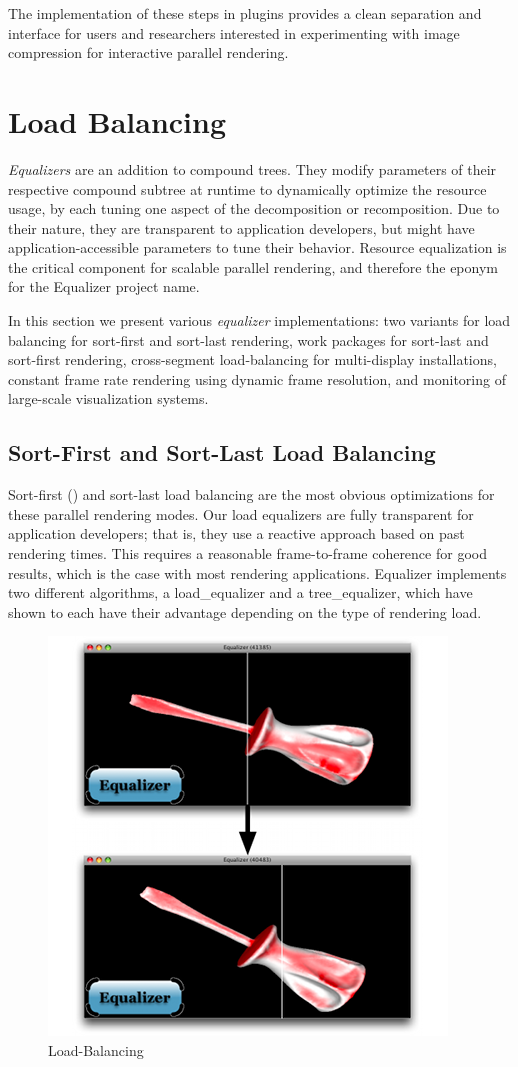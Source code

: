 The implementation of these steps in plugins provides a clean separation and
interface for users and researchers interested in experimenting with image
compression for interactive parallel rendering.


\chapter{Load Balancing}

{\em Equalizers} are an addition to compound trees. They modify parameters of
their respective compound subtree at runtime to dynamically optimize the
resource usage, by each tuning one aspect of the decomposition or recomposition.
Due to their nature, they are transparent to application developers, but might
have application-accessible parameters to tune their behavior. Resource
equalization is the critical component for scalable parallel rendering, and
therefore the eponym for the \textsf{Equalizer} project name.

In this section we present various {\em equalizer} implementations: two
variants for load balancing for sort-first and sort-last rendering, work
packages for sort-last and sort-first rendering, cross-segment load-balancing
for multi-display installations, constant frame rate rendering using dynamic
frame resolution, and monitoring of large-scale visualization systems.

\section{Sort-First and Sort-Last Load Balancing}

Sort-first () and sort-last load balancing are the most obvious
optimizations for these parallel rendering modes. Our load equalizers are fully
transparent for application developers; that is, they use a reactive approach
based on past rendering times. This requires a reasonable frame-to-frame
coherence for good results, which is the case with most rendering applications.
Equalizer implements two different algorithms, a \textsf{load\_equalizer} and a
\textsf{tree\_equalizer}, which have shown to each have their advantage
depending on the type of rendering load.

\begin{figure}
  \includegraphics[width=.382\textwidth]{images/loadeq}
  \caption{\label{floadeq}Load-Balancing}
\end{figure}

